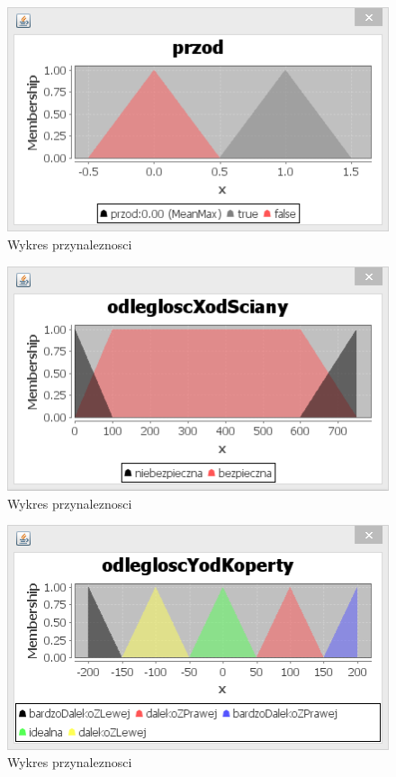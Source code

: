 \documentclass{classrep}
\begin{document}
\begin{figure}[ht]
\centering
			\includegraphics[scale=0.8]{pictures/Obraz03.png}
	\caption{Wykres przynaleznosci}
	\label{fig:Wykres przynaleznosci}
\end{figure}

\begin{figure}[ht]
\centering
			\includegraphics[scale=0.8]{pictures/Obraz04.png}
	\caption{Wykres przynaleznosci}
	\label{fig:Wykres przynaleznosci}
\end{figure}

\begin{figure}[ht]
\centering
			\includegraphics[scale=0.8]{pictures/Obraz05.png}
	\caption{Wykres przynaleznosci}
	\label{fig:Wykres przynaleznosci}
\end{figure}
\end{document}
